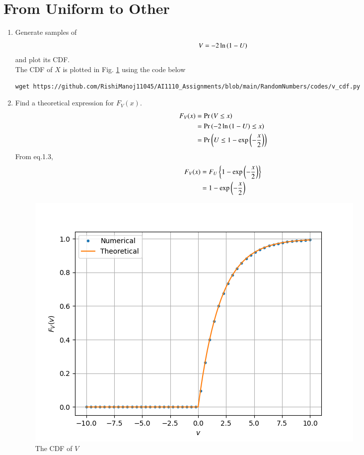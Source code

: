 \documentclass[journal,12pt,twocolumn]{IEEEtran}
\renewcommand\thesection{\arabic{section}}
\begin{document}
\section{From Uniform to Other}
\begin{enumerate}[label=\thesection.\arabic*
,ref=\thesection.\theenumi]
%
\item
Generate samples of 
%
\begin{equation}
V = -2\ln\left(1-U\right)
\end{equation}
%
and plot its CDF.\\
\solution The CDF of $X$ is plotted in Fig. \ref{fig:v_cdf} using the code below
\begin{lstlisting}
wget https://github.com/RishiManoj11045/AI1110_Assignments/blob/main/RandomNumbers/codes/v_cdf.py
\end{lstlisting}
\item Find a theoretical expression for $F_V(x)$.
%
\solution\\
\begin{align}
    F_V(x) &= \Pr\left(V\le x\right) \\
           &= \Pr\left(-2\ln\left(1-U\right)\le x\right) \\
           &= \Pr\left(U\le 1-\exp\left({-\frac{x}{2}}\right)\right) \\
\end{align}
From eq.1.3, 
\begin{align}
    F_V(x) &= F_U\left\{1-\exp\left({-\frac{x}{2}}\right)\right\} \\
           &= 1-\exp\left({-\frac{x}{2}}\right) 
\end{align}
\begin{figure}
\centering
\includegraphics[width=\columnwidth]{figs/v_cdf.png}
\caption{The CDF of $V$}
\label{fig:v_cdf}
\end{figure}
\end{enumerate}
\end{document}
